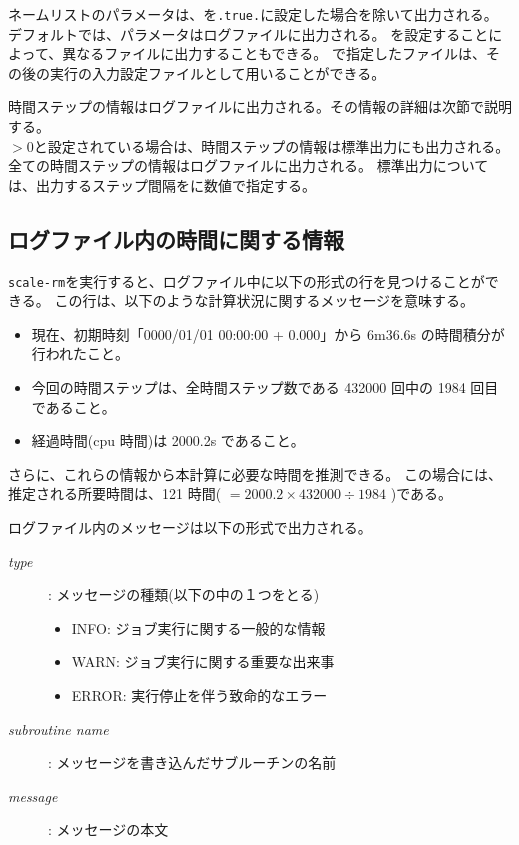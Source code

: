 ネームリストのパラメータは、を\verb|.true.|に設定した場合を除いて出力される。
デフォルトでは、パラメータはログファイルに出力される。
を設定することによって、異なるファイルに出力することもできる。
で指定したファイルは、その後の実行の入力設定ファイルとして用いることができる。

時間ステップの情報はログファイルに出力される。その情報の詳細は次節で説明する。\\
$>0$と設定されている場合は、時間ステップの情報は標準出力にも出力される。
全ての時間ステップの情報はログファイルに出力される。
標準出力については、出力するステップ間隔をに数値で指定する。


\subsection{ログファイル内の時間に関する情報}

\verb|scale-rm|を実行すると、ログファイル中に以下の形式の行を見つけることができる。
この行は、以下のような計算状況に関するメッセージを意味する。
\begin{itemize}
 \item 現在、初期時刻「0000/01/01 00:00:00 + 0.000」から 6m36.6s の時間積分が行われたこと。
 \item 今回の時間ステップは、全時間ステップ数である 432000 回中の 1984 回目であること。
 \item 経過時間(cpu 時間)は 2000.2s であること。
\end{itemize}
さらに、これらの情報から本計算に必要な時間を推測できる。
この場合には、推定される所要時間は、121 時間( $= 2000.2 \times 432000 \div 1984$ )である。

\vspace{2ex}
ログファイル内のメッセージは以下の形式で出力される。
\begin{description}
 \item[{\it type}]: メッセージの種類(以下の中の１つをとる)
   \begin{itemize}
    \item INFO: ジョブ実行に関する一般的な情報
    \item WARN: ジョブ実行に関する重要な出来事
    \item ERROR: 実行停止を伴う致命的なエラー
   \end{itemize}
 \item[{\it subroutine name}]: メッセージを書き込んだサブルーチンの名前
 \item[{\it message}]: メッセージの本文
\end{description}


